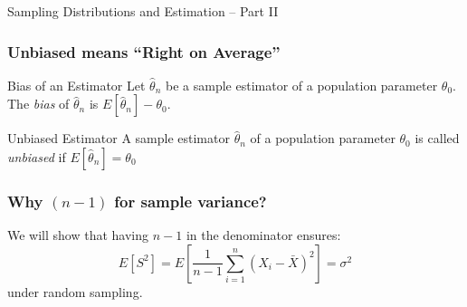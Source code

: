 \documentclass[handout]{beamer}
\date{Lecture \# 14}
\begin{document}
 


\begin{frame}[plain]
	\titlepage 
	

\end{frame} 


\begin{frame}
\begin{center}
\Huge Sampling Distributions and Estimation -- Part II
\end{center}
\end{frame}


\begin{frame}
\frametitle{Unbiased means ``Right on Average''}

\begin{block}{Bias of an Estimator}
Let $\widehat{\theta}_n$ be a sample estimator of a population parameter $\theta_0$. The \emph{bias} of $\widehat{\theta}_n$ is $E[\widehat{\theta}_n] - \theta_0$.
\end{block}

\begin{block}{Unbiased Estimator}
A sample estimator $\widehat{\theta}_n$ of a population parameter $\theta_0$ is called \emph{unbiased} if $E[\widehat{\theta}_n]= \theta_0$
\end{block}

\end{frame}



\begin{frame}
\frametitle{Why $(n-1)$ for sample variance?}
\alert{We will show that having $n-1$ in the denominator ensures:}
$$E[S^2] =E\left[ \frac{1}{n-1} \sum_{i=1}^n \left(X_i - \bar{X}\right)^2\right] = \sigma^2$$
\alert{under random sampling.}
\end{frame}


\end{document}
